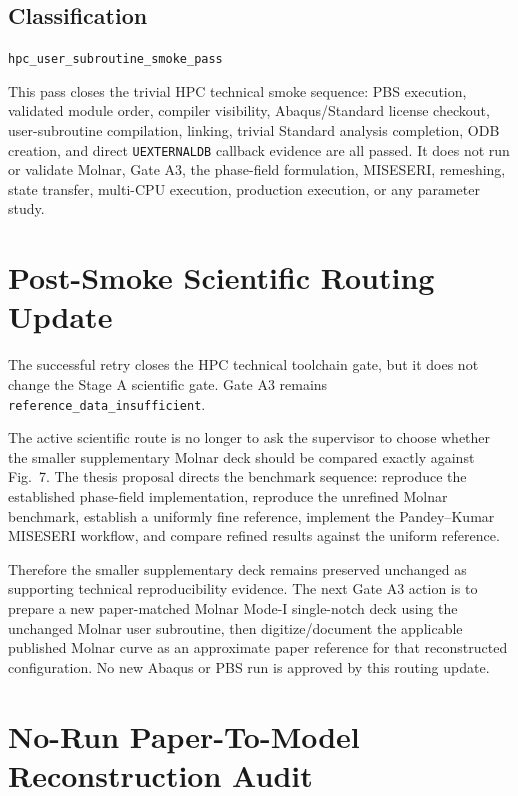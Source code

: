 \documentclass[11pt,a4paper]{article}
\begin{document}
\subsection*{Classification}

\begin{center}
\texttt{hpc\_user\_subroutine\_smoke\_pass}
\end{center}

This pass closes the trivial HPC technical smoke sequence: PBS execution, validated module order, compiler visibility, Abaqus/Standard license checkout, user-subroutine compilation, linking, trivial Standard analysis completion, ODB creation, and direct \texttt{UEXTERNALDB} callback evidence are all passed. It does not run or validate Molnar, Gate A3, the phase-field formulation, MISESERI, remeshing, state transfer, multi-CPU execution, production execution, or any parameter study.

\section{Post-Smoke Scientific Routing Update}

The successful retry closes the HPC technical toolchain gate, but it does not change the Stage A scientific gate. Gate A3 remains \texttt{reference\_data\_insufficient}.

The active scientific route is no longer to ask the supervisor to choose whether the smaller supplementary Molnar deck should be compared exactly against Fig.~7. The thesis proposal directs the benchmark sequence: reproduce the established phase-field implementation, reproduce the unrefined Molnar benchmark, establish a uniformly fine reference, implement the Pandey--Kumar MISESERI workflow, and compare refined results against the uniform reference.

Therefore the smaller supplementary deck remains preserved unchanged as supporting technical reproducibility evidence. The next Gate A3 action is to prepare a new paper-matched Molnar Mode-I single-notch deck using the unchanged Molnar user subroutine, then digitize/document the applicable published Molnar curve as an approximate paper reference for that reconstructed configuration. No new Abaqus or PBS run is approved by this routing update.

\section{No-Run Paper-To-Model Reconstruction Audit}
\end{document}
